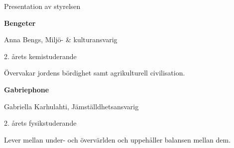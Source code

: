 \documentclass{spektraklet}
\begin{document}
\begin{artikel}{Presentation av styrelsen}{}
\begin{twocolumns}

\textbf{Bengeter}

Anna Bengs, Miljö- \& kulturansvarig

2. årets kemistuderande

Övervakar jordens bördighet samt agrikulturell civilisation.


\textbf{Gabriephone}

Gabriella Karhulahti, Jämställdhetsansvarig

2. årets fysikstuderande

Lever mellan under- och övervärlden och uppehåller balansen mellan dem.

\end{twocolumns}
\end{artikel}
\end{document}
